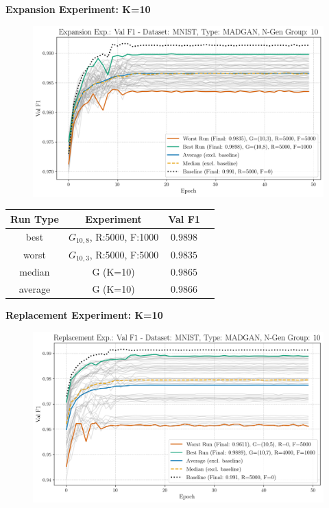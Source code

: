 \newpage
\noindent\textbf{Expansion Experiment: K=10}
\begin{figure}[htbp]
	\centering
	\includegraphics[width=.85\textwidth]{abb/strat_classifier_performance/MNIST_STRATIFIED_CLASSIFIERS_MADGAN_NEW/expansion_experiments/val_f1_score_MADGAN_MNIST_n_gen_10_all.png}
	\label{fig:app_strat_class_performance_expansion_exp._val_f1_score_10}
\end{figure}
\begin{table}[H]
	\vspace{-1em}
	\centering
	\begin{tabular}{|c|c|c|c|}
		\hline
		Run Type & Experiment & Val F1 \\ \hline
		best & \(G_{10, 8}\), R:5000, F:1000 & $0.9898$\\ \hline
		worst & \(G_{10, 3}\), R:5000, F:5000 & $0.9835$\\ \hline
		median & G (K=10) & $0.9865$\\ \hline
		average & G (K=10) & $0.9866$
		\\ \hline
	\end{tabular}
\end{table}
\noindent\textbf{Replacement Experiment: K=10}
\begin{figure}[htbp]
	\centering
	\includegraphics[width=.85\textwidth]{abb/strat_classifier_performance/MNIST_STRATIFIED_CLASSIFIERS_MADGAN_NEW/replacement_experiments/val_f1_score_MADGAN_MNIST_n_gen_10_all.png}
	\label{fig:app_strat_class_performance_replacement_exp._val_f1_score_10}
\end{figure}
